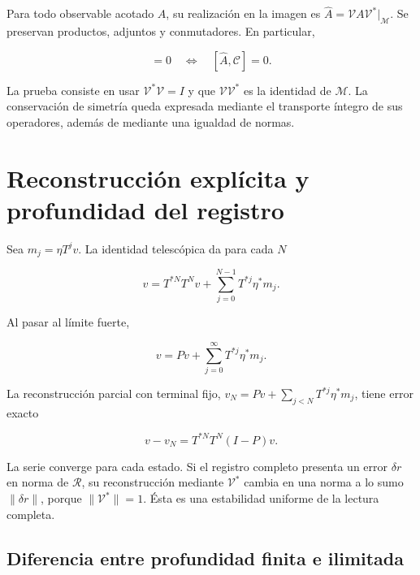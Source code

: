 \begin{corollary}
Para todo observable acotado \(A\), su realización en la imagen es \(\widehat A=\mathcal V A\mathcal V^*|_{\mathcal M}\). Se preservan productos, adjuntos y conmutadores. En particular,

\begin{equation}
[A,C]=0\quad\Longleftrightarrow\quad[\widehat A,\mathcal C]=0.
\label{x_reciprocidad:nuc03:eq:7}
\end{equation}
\end{corollary}

La prueba consiste en usar \(\mathcal V^*\mathcal V=I\) y que \(\mathcal V\mathcal V^*\) es la identidad de \(\mathcal M\). La conservación de simetría queda expresada mediante el transporte íntegro de sus operadores, además de mediante una igualdad de normas.

\section{Reconstrucción explícita y profundidad del registro}

Sea \(m_j=\eta T^jv\). La identidad telescópica da para cada \(N\)

\begin{equation}
\boxed{v=T^{*N}T^Nv+\sum_{j=0}^{N-1}T^{*j}\eta^*m_j.}
\label{x_reciprocidad:nuc03:eq:8}
\end{equation}

Al pasar al límite fuerte,

\begin{equation}
\boxed{v=Pv+\sum_{j=0}^{\infty}T^{*j}\eta^*m_j.}
\label{x_reciprocidad:nuc03:eq:9}
\end{equation}

La reconstrucción parcial con terminal fijo,
\(v_N=Pv+\sum_{j<N}T^{*j}\eta^*m_j\), tiene error exacto

\begin{equation}
v-v_N=T^{*N}T^N(I-P)v.
\label{x_reciprocidad:nuc03:eq:10}
\end{equation}

La serie converge para cada estado. Si el registro completo presenta un error \(\delta r\) en norma de \(\mathcal R\), su reconstrucción mediante \(\mathcal V^*\) cambia en una norma a lo sumo \(\|\delta r\|\), porque \(\|\mathcal V^*\|=1\). Ésta es una estabilidad uniforme de la lectura completa.

\subsection{Diferencia entre profundidad finita e ilimitada}

